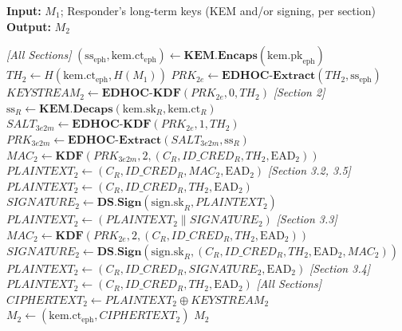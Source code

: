 \documentclass{easychair}
\begin{document}
\begin{algorithm}[H]
\caption{Step 2 (Responder) --- Process $M_1$ and Prepare $M_2$}
\label{alg:step2}
\textbf{Input:} $M_1$; Responder's long-term keys (KEM and/or signing, per section) \\
\textbf{Output:} $M_2$
\begin{algorithmic}[1]
\Statex \textit{[All Sections]}
\State $(\mathrm{ss}_{\mathrm{eph}}, \mathrm{kem.ct}_{\mathrm{eph}}) \gets \mathbf{KEM.Encaps}(\mathrm{kem.pk}_{\mathrm{eph}})$
\State $TH_2 \gets H(\mathrm{kem.ct}_{\mathrm{eph}}, H(M_1))$
\State $PRK_{2e} \gets \mathbf{EDHOC\text{-}Extract}(TH_2, \mathrm{ss}_{\mathrm{eph}})$
\State $KEYSTREAM_2 \gets \mathbf{EDHOC\text{-}KDF}(PRK_{2e}, 0, TH_2)$
\Statex \textit{[Section 2]} 
\State $\mathrm{ss}_R \gets \mathbf{KEM.Decaps}(\mathrm{kem.sk}_R, \mathrm{kem.ct}_R)$
\State $SALT_{3e2m} \gets \mathbf{EDHOC\text{-}KDF}(PRK_{2e}, 1, TH_2)$
\State $PRK_{3e2m} \gets \mathbf{EDHOC\text{-}Extract}(SALT_{3e2m}, \mathrm{ss}_R)$
\State $MAC_2 \gets \mathbf{KDF}(PRK_{3e2m}, 2, (C_R, ID\_CRED_R, TH_2, \mathrm{EAD}_2))$
\State $PLAINTEXT_2 \gets (C_R, ID\_CRED_R, MAC_2, \mathrm{EAD}_2)$
\Statex \textit{[Section 3.2, 3.5]} 
\State $PLAINTEXT_2 \gets (C_R, ID\_CRED_R, TH_2, \mathrm{EAD}_2)$
\State $SIGNATURE_2 \gets \mathbf{DS.Sign}(\mathrm{sign.sk}_R, PLAINTEXT_2)$
\State $PLAINTEXT_2 \gets (PLAINTEXT_2 \parallel SIGNATURE_2)$
\Statex \textit{[Section 3.3]} 
\State $MAC_2 \gets \mathbf{KDF}(PRK_{2e}, 2, (C_R, ID\_CRED_R, TH_2, \mathrm{EAD}_2))$
\State $SIGNATURE_2 \gets \mathbf{DS.Sign}(\mathrm{sign.sk}_R, (C_R, ID\_CRED_R, TH_2, \mathrm{EAD}_2, MAC_2))$
\State $PLAINTEXT_2 \gets (C_R, ID\_CRED_R, SIGNATURE_2, \mathrm{EAD}_2)$
\Statex \textit{[Section 3.4]} 
\State $PLAINTEXT_2 \gets (C_R, ID\_CRED_R, TH_2, \mathrm{EAD}_2)$
\Statex \textit{[All Sections]}
\State $CIPHERTEXT_2 \gets PLAINTEXT_2 \oplus KEYSTREAM_2$
\State $M_2 \gets (\mathrm{kem.ct}_{\mathrm{eph}}, CIPHERTEXT_2)$
\State \Return $M_2$
\end{algorithmic}
\end{algorithm}
\end{document}
